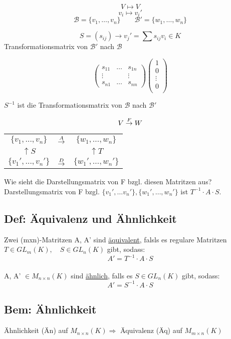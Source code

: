 \documentclass[titlepage,12pt,a4paper,ngerman]{report}
\begin{document}
$$V \mapsto V$$
$$v_i \mapsto v_i'$$
$$\mathcal{B} = \{v_1, \dots , v_n\} \qquad \mathcal{B}' = \{w_1,\dots , w_n\} $$

$$S=(s_{ij}) \rightarrow v_j'= \sum s_{ij} v_i \in K$$
Transformationsmatrix von $\mathcal{B'}$ nach $\mathcal{B}$

$$\begin{pmatrix}
s_{11} & \dots & s_{1n} \\
\vdots & & \vdots \\
s_{n1} & \dots & s_{nn}
\end{pmatrix} \begin{pmatrix}
1\\
0\\
\vdots \\
0\\
\end{pmatrix}$$

$S^{-1}$ ist die Transformationsmatrix von $\mathcal{B}$ nach $\mathcal{B'}$

$$V\buildrel F \over \to W$$
\begin{center}
	\begin{tabular}{ccc}
		$\{v_1,\dots,v_n\}$ & $\buildrel A \over \rightarrow$ & $\{w_1,\dots , w_n\}$ \\
		$\uparrow S$ &  & $\uparrow T$ \\
		$\{v_1',\dots, v_n'\}$ & $\buildrel D \over \rightarrow$ & $\{w_1',\dots, w_n'\}$
	\end{tabular}
\end{center}

Wie sieht die Darstellungsmatrix von F bzgl. diesen Matritzen aus?\\
Darstellungsmatrix von F bzgl. $\{v_1',\dots v_n'\} ,\{w_1',\dots ,w_n'\}$ ist $T^{-1} \cdot A \cdot S$.
\subsection{Def: Äquivalenz und Ähnlichkeit} Zwei (mxn)-Matritzen A, A' sind \underline{äquivalent}, falsls es regulare Matritzen $T\in GL_m(K),\quad S \in GL_n(K)$ gibt, sodass: $$A' = T^{-1} \cdot A \cdot S$$\\
A, A' $\in M_{n\times n}(K)$ sind \underline{ähnlich}, falls es $S \in GL_n(K)$ gibt, sodass: $$A' = S^{-1} \cdot A \cdot S$$

\subsection{Bem: Ähnlichkeit}
Ähnlichkeit (Än) auf $M_{n\times n}(K)\Rightarrow$ Äquivalenz (Äq) auf $M_{m\times n}(K)$
\end{document}
